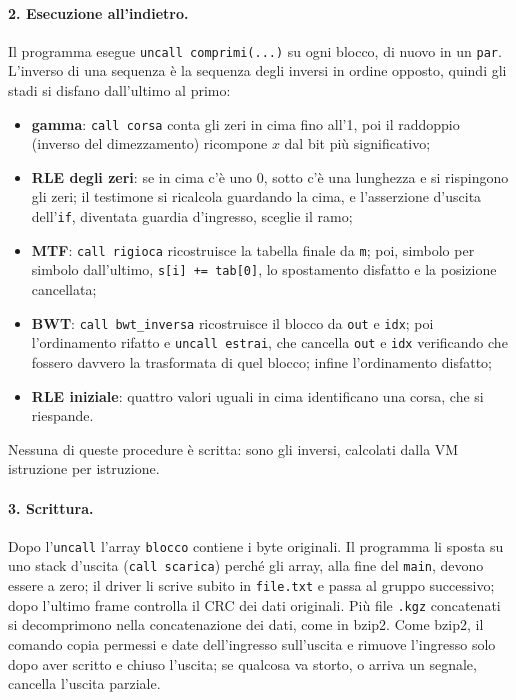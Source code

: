 \documentclass[11pt,a4paper]{article}
\newcommand{\kw}[1]{\texttt{#1}}
\begin{document}
\paragraph{2. Esecuzione all'indietro.} Il programma esegue \kw{uncall comprimi(...)} su ogni blocco, di nuovo in un \kw{par}. L'inverso di una sequenza è la sequenza degli inversi in ordine opposto, quindi gli stadi si disfano dall'ultimo al primo:
\begin{itemize}
\item \textbf{gamma}: \kw{call corsa} conta gli zeri in cima fino all'1, poi il raddoppio (inverso del dimezzamento) ricompone $x$ dal bit più significativo;
\item \textbf{RLE degli zeri}: se in cima c'è uno 0, sotto c'è una lunghezza e si rispingono gli zeri; il testimone si ricalcola guardando la cima, e l'asserzione d'uscita dell'\kw{if}, diventata guardia d'ingresso, sceglie il ramo;
\item \textbf{MTF}: \kw{call rigioca} ricostruisce la tabella finale da \kw{m}; poi, simbolo per simbolo dall'ultimo, \kw{s[i] += tab[0]}, lo spostamento disfatto e la posizione cancellata;
\item \textbf{BWT}: \kw{call bwt\_inversa} ricostruisce il blocco da \kw{out} e \kw{idx}; poi l'ordinamento rifatto e \kw{uncall estrai}, che cancella \kw{out} e \kw{idx} verificando che fossero davvero la trasformata di quel blocco; infine l'ordinamento disfatto;
\item \textbf{RLE iniziale}: quattro valori uguali in cima identificano una corsa, che si riespande.
\end{itemize}
Nessuna di queste procedure è scritta: sono gli inversi, calcolati dalla VM istruzione per istruzione.

\paragraph{3. Scrittura.} Dopo l'\kw{uncall} l'array \kw{blocco} contiene i byte originali. Il programma li sposta su uno stack d'uscita (\kw{call scarica}) perché gli array, alla fine del \kw{main}, devono essere a zero; il driver li scrive subito in \kw{file.txt} e passa al gruppo successivo; dopo l'ultimo frame controlla il CRC dei dati originali. Più file \kw{.kgz} concatenati si decomprimono nella concatenazione dei dati, come in bzip2. Come bzip2, il comando copia permessi e date dell'ingresso sull'uscita e rimuove l'ingresso solo dopo aver scritto e chiuso l'uscita; se qualcosa va storto, o arriva un segnale, cancella l'uscita parziale.
\end{document}
